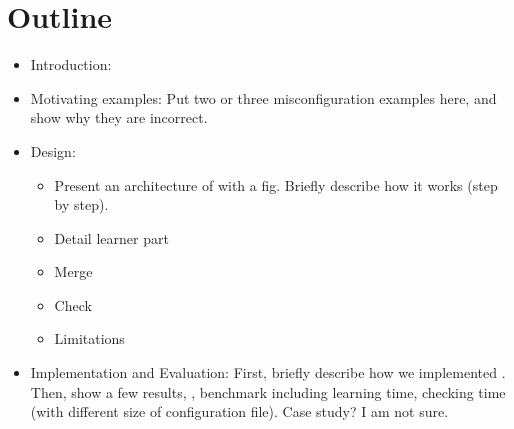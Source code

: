 \section*{Outline}

\begin{itemize}

\item Introduction: 

\item Motivating examples: Put two or three misconfiguration
  examples here, and show why they are incorrect.

\item \app Design: 
  \begin{itemize}
  \item Present an architecture of \app with a fig. Briefly describe 
    how it works (step by step).
  \item Detail learner part
  \item Merge
  \item Check 
  \item Limitations
  \end{itemize}

\item Implementation and Evaluation:
  First, briefly describe how we implemented \app.
  Then, show a few results, \eg, benchmark including learning time,
  checking time (with different size of configuration file).
  Case study?  I am not sure.

\end{itemize}


